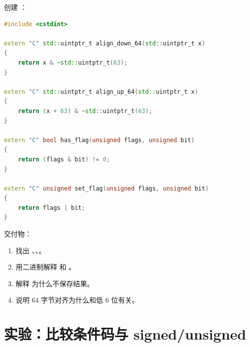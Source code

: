 \begin{labbox}
创建 ：

\begin{lstlisting}[language=C++]
#include <cstdint>

extern "C" std::uintptr_t align_down_64(std::uintptr_t x)
{
    return x & ~std::uintptr_t(63);
}

extern "C" std::uintptr_t align_up_64(std::uintptr_t x)
{
    return (x + 63) & ~std::uintptr_t(63);
}

extern "C" bool has_flag(unsigned flags, unsigned bit)
{
    return (flags & bit) != 0;
}

extern "C" unsigned set_flag(unsigned flags, unsigned bit)
{
    return flags | bit;
}
\end{lstlisting}

交付物：

\begin{enumerate}
  \item 找出 、、。
  \item 用二进制解释  和 。
  \item 解释  为什么不保存结果。
  \item 说明 64 字节对齐为什么和低 6 位有关。
\end{enumerate}
\end{labbox}

\section{实验：比较条件码与 signed/unsigned}

